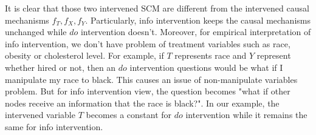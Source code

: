 
It is clear that those two intervened SCM are different from the intervened causal mechanisms $f_T, f_X, f_Y$. Particularly, info intervention keeps the causal mechanisms unchanged while $do$ intervention doesn't. Moreover, for empirical interpretation of info intervention, we don't have problem of treatment variables such as race, obesity or cholesterol level. For example, if $T$ represents race and $Y$ represent whether hired or not, then an $do$ intervention questions would be what if I manipulate my race to black. This causes an issue of non-manipulate variables problem. But for info intervention view, the question becomes "what if other nodes receive an information that the race is black?".  In our example, the intervened variable $T$ becomes a constant for $do$ intervention while it remains the same  for info intervention. 



